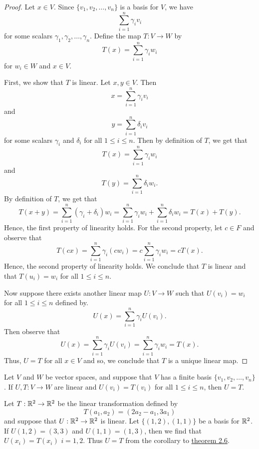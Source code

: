 \begin{proof}
Let \( x \in V  \). Since \( \{ v_{1}, v_{2}, \dots, v_{n} \}  \) is a basis for \( V  \), we have
\[  \sum_{ i=1 }^{ n } \gamma_{i} v_{i}  \] for some scalars \( \gamma_{1}, \gamma_{2}, \dots, \gamma_{n}  \). Define the map \( T: V \to W  \) by
\[  T(x) = \sum_{ i=1 }^{ n } \gamma_{i} w_{i}  \]
for \( w_{i} \in W  \) and \( x \in V  \). 

First, we show that \( T  \) is linear. Let \( x,y \in V  \). Then 
\[ x =  \sum_{ i=1 }^{ n } \gamma_{i} v_{i}  \] and 
\[ y =  \sum_{ i=1 }^{ n } \delta_{i} v_{i}  \] for some scalars \( \gamma_{i}  \) and \( \delta_{i}  \) for all \( 1 \leq i \leq n \). Then by definition of \( T  \), we get that 
\[  T(x) = \sum_{ i=1 }^{ n } \gamma_{i} w_{i}  \] and 
\[ T(y) = \sum_{ i=1 }^{ n } \delta_{i} w_{i}. \]
By definition of \( T  \), we get that  
\[  T(x+y) = \sum_{ i=1 }^{ n } (\gamma_{i} + \delta_{i}) w_{i} = \sum_{ i=1 }^{ n } \gamma_{i} w_{i} + \sum_{ i=1 }^{ n } \delta_{i} w_{i} = T(x) + T(y).  \]
Hence, the first property of linearity holds. For the second property, let \( c \in F  \) and observe that
\[  T(cx) = \sum_{ i=1 }^{ n } \gamma_{i} (cw_{i}) = c \sum_{ i=1 }^{ n } \gamma_{i} w_{i} = c T(x). \]
Hence, the second property of linearity holds. We conclude that \( T  \) is linear and that \( T(u_{i}) = w_{i}  \) for all \( 1 \leq i \leq n \).

Now suppose there exists another linear map \( U: V \to W  \) such that \( U(v_{i}) = w_{i}  \) for all \( 1 \leq i \leq n \) defined by.
\[ U(x) = \sum_{i =1  }^{ n } \gamma_{i} U(v_{i}).  \]
Then observe that
\[ U(x) = \sum_{ i=1 }^{ n } \gamma_{i} U(v_{i}) = \sum_{ i=1 }^{ n } \gamma_{i} w_{i} = T(x). \]
Thus, \( U = T  \) for all \( x \in V  \) and so, we conclude that \( T  \) is a unique linear map.
\end{proof}

\begin{corollary}
  Let \( V  \) and \( W  \) be vector spaces, and suppose that \( V  \) has a finite basis \( \{ v_{1}, v_{2}, \dots, v_{n} \}  \). If \( U,T : V \to W  \) are linear and \( U(v_{i}) = T(v_{i}) \) for all \( 1 \leq i \leq n \), then \( U = T  \).  
\end{corollary}

\begin{eg}
    Let \( T : \mathbb{R}^{2} \to \mathbb{R}^{2}  \) be the linear transformation defined by 
    \[  T(a_{1}, a_{2}) = (2a_{2} - a_{1}, 3a_{1}) \]
    and suppose that \( U: \mathbb{R}^{2} \to \mathbb{R}^{2}  \) is linear. Let \( \{ (1,2), (1,1) \}  \) be a basis for \( \mathbb{R}^{2} \). If \( U(1,2) = (3,3)  \) and \( U(1,1) = (1,3)  \), then we find that \( U(x_{i}) = T(x_{i}) \) \( i = 1,2 \). Thus \( U = T  \) from the corollary to {\hyperref[Theorem 2.6]{theorem 2.6}}. 
\end{eg}


